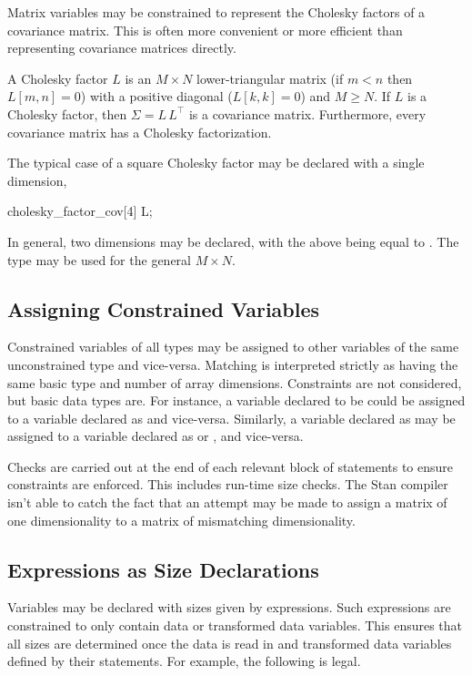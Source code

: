 Matrix variables may be constrained to represent the Cholesky factors
of a covariance matrix.  This is often more convenient or more
efficient than representing covariance matrices directly.

A Cholesky factor $L$ is an $M \times N$ lower-triangular matrix (if
$m < n$ then $L[m,n] =0$) with a positive diagonal ($L[k,k] = 0$) and
$M \geq N$.  If $L$ is a Cholesky factor, then $\Sigma = L \, L^{\top}$
is a covariance matrix.  Furthermore, every covariance matrix has a
Cholesky factorization.

The typical case of a square Cholesky factor may be declared with a
single dimension,
%
\begin{stancode}
cholesky_factor_cov[4] L;
\end{stancode}
%
In general, two dimensions may be declared, with the above being equal to
.  The
type  may be used for the general
$M \times N$.

\subsection{Assigning Constrained Variables}

Constrained variables of all types may be assigned to other variables
of the same unconstrained type and vice-versa.  Matching is interpreted strictly
as having the same basic type and number of array dimensions.
Constraints are not considered, but basic data types are. For instance, a
variable declared to be  could be assigned
to a variable declared as  and vice-versa.  Similarly, a
variable declared as  may be assigned to a variable
declared as  or
, and vice-versa.

Checks are carried out at the end of each relevant block of statements
to ensure constraints are enforced.  This includes run-time size
checks.  The Stan compiler isn't able to catch the fact that an
attempt may be made to assign a matrix of one dimensionality to a
matrix of mismatching dimensionality.


\subsection{Expressions as Size Declarations}

Variables may be declared with sizes given by expressions.  Such
expressions are constrained to only contain data or transformed data
variables.  This ensures that all sizes are determined once the data
is read in and transformed data variables defined by their statements.
For example, the following is legal.
%
\begin{stancode}
data {
  int<lower=0> N_observed;    int<lower=0> N_missing;
  // ...
transformed parameters {
  vector[N_observed + N_missing] y;
  // ...
\end{stancode}

